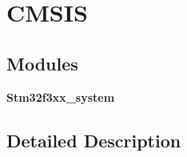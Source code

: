 \section{C\+M\+S\+IS}
\label{group__CMSIS}
\subsection*{Modules}
\begin{DoxyCompactItemize}
\item 
\textbf{ Stm32f3xx\+\_\+system}
\end{DoxyCompactItemize}


\subsection{Detailed Description}
